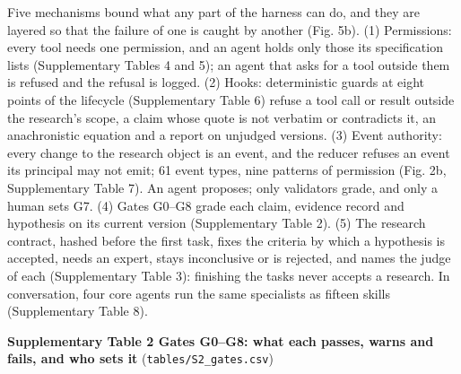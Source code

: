 \documentclass[
]{article}
\begin{document}
Five mechanisms bound what any part of the harness can do, and they are
layered so that the failure of one is caught by another (Fig. 5b). (1)
Permissions: every tool needs one permission, and an agent holds only
those its specification lists (Supplementary Tables 4 and 5); an agent
that asks for a tool outside them is refused and the refusal is logged.
(2) Hooks: deterministic guards at eight points of the lifecycle
(Supplementary Table 6) refuse a tool call or result outside the
research's scope, a claim whose quote is not verbatim or contradicts it,
an anachronistic equation and a report on unjudged versions. (3) Event
authority: every change to the research object is an event, and the
reducer refuses an event its principal may not emit; 61 event types,
nine patterns of permission (Fig. 2b, Supplementary Table 7). An agent
proposes; only validators grade, and only a human sets G7. (4) Gates
G0--G8 grade each claim, evidence record and hypothesis on its current
version (Supplementary Table 2). (5) The research contract, hashed
before the first task, fixes the criteria by which a hypothesis is
accepted, needs an expert, stays inconclusive or is rejected, and names
the judge of each (Supplementary Table 3): finishing the tasks never
accepts a research. In conversation, four core agents run the same
specialists as fifteen skills (Supplementary Table 8).

\textbf{Supplementary Table 2 \textbar{} Gates G0--G8: what each passes,
warns and fails, and who sets it} (\texttt{tables/S2\_gates.csv})
\end{document}
